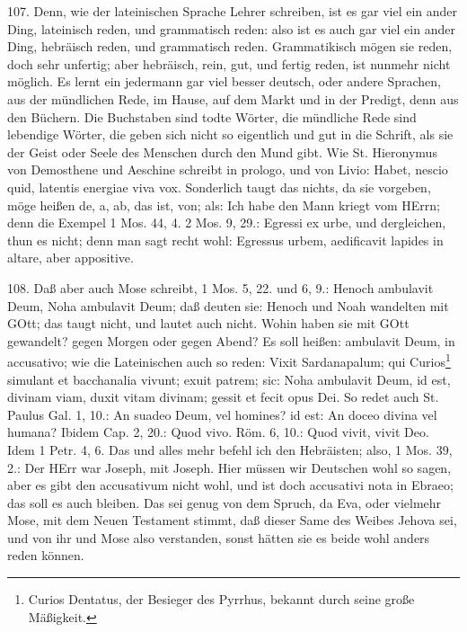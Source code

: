 107. Denn, wie der lateinischen Sprache Lehrer schreiben, ist es gar viel ein ander Ding, lateinisch reden, und grammatisch reden: also ist es auch gar viel ein ander Ding, hebräisch reden, und grammatisch reden. Grammatikisch mögen sie reden, doch sehr unfertig; aber hebräisch, rein, gut, und fertig reden, ist nunmehr nicht möglich. Es lernt ein jedermann gar viel besser deutsch, oder andere Sprachen, aus der mündlichen Rede, im Hause, auf dem Markt und in der Predigt, denn aus den Büchern. Die Buchstaben sind todte Wörter, die mündliche Rede sind lebendige Wörter, die geben sich nicht so eigentlich und gut in die Schrift, als sie der Geist oder Seele des Menschen durch den Mund gibt. Wie St. Hieronymus von Demosthene und Aeschine schreibt in prologo, und von Livio: Habet, nescio quid, latentis energiae viva vox. Sonderlich taugt das nichts, da sie vorgeben,  möge heißen de, a, ab, das ist, von; als: Ich habe den Mann kriegt vom HErrn; denn die Exempel 1 Mos. 44, 4. 2 Mos. 9, 29.: Egressi ex urbe, und dergleichen, thun es nicht; denn man sagt recht wohl: Egressus urbem, aedificavit lapides in altare, aber appositive.

108. Daß aber auch Mose schreibt, 1 Mos. 5, 22. und 6, 9.: Henoch ambulavit  Deum, Noha ambulavit  Deum; daß deuten sie: Henoch und Noah wandelten mit GOtt; das taugt nicht, und lautet auch nicht. Wohin haben sie mit GOtt gewandelt? gegen Morgen oder gegen Abend? Es soll heißen: ambulavit Deum, in accusativo; wie die Lateinischen auch so reden: Vixit Sardanapalum; qui Curios\footnote{Curios Dentatus, der Besieger des Pyrrhus, bekannt durch seine große Mäßigkeit.} simulant et bacchanalia vivunt; exuit patrem; sic: Noha ambulavit Deum, id est, divinam viam, duxit vitam divinam; gessit et fecit opus Dei. So redet auch St. Paulus Gal. 1, 10.: An suadeo Deum, vel homines? id est: An doceo divina vel humana? Ibidem Cap. 2, 20.: Quod vivo. Röm. 6, 10.: Quod vivit, vivit Deo. Idem 1 Petr. 4, 6. Das und alles mehr befehl ich den Hebräisten; also, 1 Mos. 39, 2.: Der HErr war  Joseph, mit Joseph. Hier müssen wir Deutschen wohl so sagen, aber es gibt den accusativum nicht wohl, und ist doch accusativi nota in Ebraeo; das soll es auch bleiben. Das sei genug von dem Spruch, da
Eva, oder vielmehr Mose, mit dem Neuen Testament stimmt, daß dieser Same des Weibes Jehova sei, und von ihr und Mose also verstanden, sonst hätten sie es beide wohl anders reden können.

